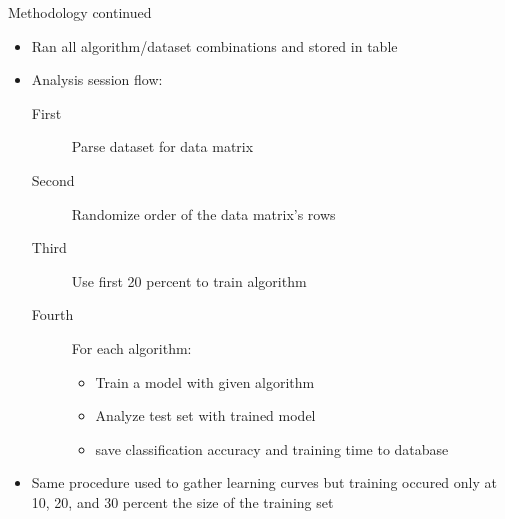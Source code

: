 \documentclass{beamer}
\begin{document}
\begin{frame}{Methodology continued}
  \begin{itemize}
     \item Ran all algorithm/dataset combinations and stored in table
     \item Analysis session flow:
       \begin{description}
         \item[First] Parse dataset for data matrix
         \item[Second] Randomize order of the data matrix's rows
         \item[Third] Use first 20 percent to train algorithm
         \item[Fourth] For each algorithm:
           \begin{itemize}
              \item Train a model with given algorithm
              \item Analyze test set with trained model
              \item save classification accuracy and training time to
                    database
           \end{itemize}
       \end{description}
     \item Same procedure used to gather learning curves but training
           occured only at 10, 20, and 30 percent the size of the training
           set
  \end{itemize}
\end{frame}
\end{document}
